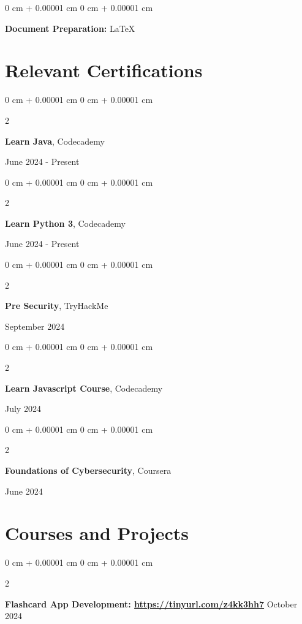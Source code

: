 \documentclass[10pt, letterpaper]{article}
\newenvironment{onecolentry}{
    \begin{adjustwidth}{
        0 cm + 0.00001 cm
    }{
        0 cm + 0.00001 cm
    }
}{
    \end{adjustwidth}
} %
\newenvironment{twocolentry}[2][]{
    \onecolentry
    \def\secondColumn{#2}
    \setcolumnwidth{\fill, 4.5 cm}
    \begin{paracol}{2}
}{
    \switchcolumn \raggedleft \secondColumn
    \end{paracol}
    \endonecolentry
} %
\begin{document}
    \vspace{0.05 cm}

        \begin{onecolentry}
            \textbf{Document Preparation:} LaTeX
        \end{onecolentry}






\section{Relevant Certifications}

    \begin{twocolentry}{
    June 2024 - Present
}
    \textbf{Learn Java}, Codecademy   
\end{twocolentry}

 \vspace{0.05 cm}
     \begin{twocolentry}{
    June 2024 - Present
}
    \textbf{Learn Python 3}, Codecademy   
\end{twocolentry}

 \vspace{0.05 cm}
      \begin{twocolentry}{
    September 2024
}
    \textbf{Pre Security}, TryHackMe
\end{twocolentry}

 \vspace{0.05 cm}

       \begin{twocolentry}{
    July 2024
}
    \textbf{Learn Javascript Course}, Codecademy
\end{twocolentry}

 \vspace{0.05 cm}
       \begin{twocolentry}{
   June 2024
}
    \textbf{Foundations of Cybersecurity}, Coursera
    
\end{twocolentry}

 \vspace{0.05 cm}
        


    
    \section{Courses and Projects}
    \begin{twocolentry}{ October 2024
        }
            \textbf{Flashcard App Development: \href{https://github.com/rw200219/my-intellij-project}{https://tinyurl.com/z4kk3hh7}}\end{twocolentry}
\end{document}

